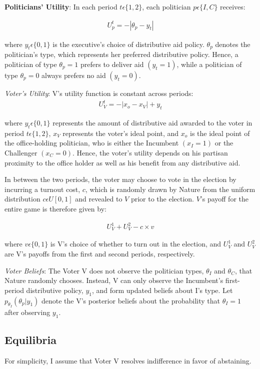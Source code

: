 \documentclass[12pt]{paper}
\begin{document}
\textbf{Politicians' Utility}: In each period $t \epsilon \{1,2\}$, each politician $p \epsilon \{I,C\}$ receives: 

\begin{gather}
U_{p}^t = -|\theta_p - y_t|
\end{gather}

where $y_t\epsilon \{0,1\}$ is the executive’s choice of distributive aid policy. $\theta_p$ denotes the politician’s type, which represents her preferred distributive policy. Hence, a politician of type $\theta_p = 1$ prefers to deliver aid $(y_t = 1)$, while a politician of type $\theta_p = 0$ always prefers no aid $(y_t = 0).$

\emph{Voter's Utility}: V’s utility function is constant across periods: 
\begin{gather}
U_{V}^t = -|x_o - x_V| + y_t
\end{gather}

where $y_t \epsilon \{0,1\}$ represents the amount of distributive aid awarded to the voter in period $t \epsilon \{1,2\}$, $x_V$ represents the voter’s ideal point, and $x_o$ is the ideal point of the office-holding politician, who is either the Incumbent $(x_I = 1)$ or the Challenger $(x_C = 0).$ Hence, the voter’s utility depends on his partisan proximity to the office holder as well as his benefit from any distributive aid.

In between the two periods, the voter may choose to vote in the election by incurring a turnout cost, $c$, which is randomly drawn by Nature from the uniform distribution $c \epsilon U[0,1]$ and revealed to $V$ prior to the election. $V$’s payoff for the entire game is therefore given by:

\begin{gather}
U_{V}^1 + U_{V}^2 - c \times v
\end{gather}

where $v \epsilon \{0,1\}$ is V’s choice of whether to turn out in the election, and $U_{V}^1$ and $U_{V}^2$ are V’s payoffs from the first and second periods, respectively.

\emph{Voter Beliefs}: The Voter V does not observe the politician types, $\theta_I$ and $\theta_C$, that Nature randomly chooses. Instead, V can only observe the Incumbent's first-period distributive policy,  $y_1$, and form updated beliefs about I’s type. Let $p_{\theta_I} (\theta_p | y_1 )$ denote the V’s posterior beliefs about the probability that $\theta_I = 1$ after observing $y_1$.

\subsection{Equilibria}
For simplicity, I assume that Voter V resolves indifference in favor of abstaining.
	
\end{document}
